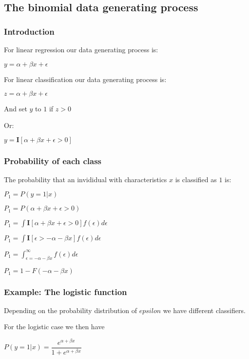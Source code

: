
\subsection{The binomial data generating process}

\subsubsection{Introduction}

For linear regression our data generating process is:

\(y=\alpha + \beta x +\epsilon \)

For linear classification our data generating process is:

\(z=\alpha + \beta x +\epsilon \)

And set \(y\) to \(1\) if \(z>0\)

Or:

\(y=\mathbf I[\alpha+\beta x+\epsilon >0]\)

\subsubsection{Probability of each class}

The probability that an invididual with characteristics \(x\) is classified as \(1\) is:

\(P_1=P(y=1|x)\)

\(P_1=P(\alpha + \beta x+\epsilon >0)\)

\(P_1=\int \mathbf I [\alpha + \beta x+\epsilon >0]f(\epsilon )d\epsilon \)

\(P_1=\int \mathbf I [\epsilon >-\alpha-\beta x ]f(\epsilon )d\epsilon \)

\(P_1=\int_{\epsilon=-\alpha-\beta x}^\infty f(\epsilon )d\epsilon \)

\(P_1=1-F(-\alpha-\beta x) \)

\subsubsection{Example: The logistic function}

Depending on the probability distribution of \(epsilon \) we have different classifiers.

For the logistic case we then have

\(P(y=1|x)=\dfrac{e^{\alpha + \beta x}}{1+e^{\alpha + \beta x}}\)

